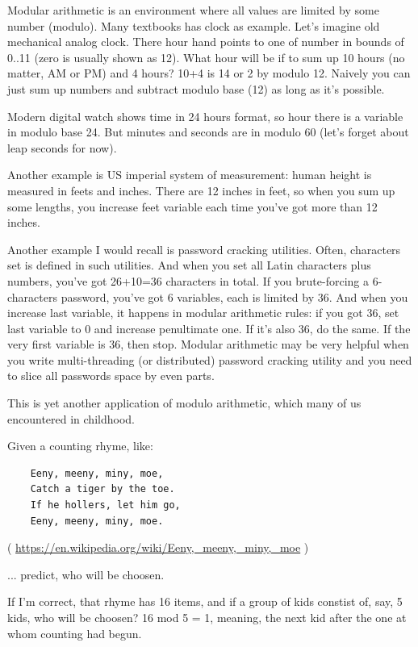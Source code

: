 
\leveldown{}

Modular arithmetic is an environment where all values are limited by some number (modulo).
Many textbooks has clock as example. Let's imagine old mechanical analog clock.
There hour hand points to one of number in bounds of 0..11 (zero is usually shown as 12).
What hour will be if to sum up 10 hours (no matter, AM or PM) and 4 hours?
10+4 is 14 or 2 by modulo 12.
Naively you can just sum up numbers and subtract modulo base (12) as long as it's possible.

Modern digital watch shows time in 24 hours format, so hour there is a variable in modulo base 24.
But minutes and seconds are in modulo 60 (let's forget about leap seconds for now).

Another example is US imperial system of measurement: human height is measured in feets and inches.
There are 12 inches in feet, so when you sum up some lengths, you increase feet variable each time you've got more than 12 inches.

Another example I would recall is password cracking utilities. Often, characters set is defined in such utilities.
And when you set all Latin characters plus numbers, you've got 26+10=36 characters in total.
If you brute-forcing a 6-characters password, you've got 6 variables, each is limited by 36.
And when you increase last variable, it happens in modular arithmetic rules: if you got 36, set last variable to 0 and increase penultimate
one. If it's also 36, do the same. If the very first variable is 36, then stop.
Modular arithmetic may be very helpful when you write multi-threading (or distributed) password cracking utility and you need to slice all passwords space by even
parts.

\myhrule{}

This is yet another application of modulo arithmetic, which many of us encountered in childhood.

Given a counting rhyme, like:

\begin{lstlisting}
    Eeny, meeny, miny, moe,
    Catch a tiger by the toe.
    If he hollers, let him go,
    Eeny, meeny, miny, moe.
\end{lstlisting}
( \url{https://en.wikipedia.org/wiki/Eeny,_meeny,_miny,_moe} )

... predict, who will be choosen.

If I'm correct, that rhyme has 16 items, and if a group of kids constist of, say, 5 kids, who will be choosen?
16 mod 5 = 1, meaning, the next kid after the one at whom counting had begun.

